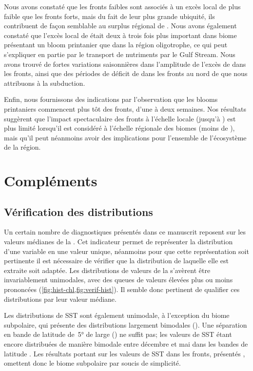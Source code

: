 Nous avons constaté que les fronts faibles sont associés à un excès local de  plus faible que les fronts forts, mais du fait de leur plus grande ubiquité, ils contribuent de façon semblable au surplus régional de .
Nous avons également constaté que l'excès local de  était deux à trois fois plus important dans biome présentant un bloom printanier que dans la région oligotrophe, ce qui peut s'expliquer en partie par le transport de nutriments par le Gulf Stream.
Nous avons trouvé de fortes variations saisonnières dans l'amplitude de l'excès de  dans les fronts, ainsi que des périodes de déficit de  dans les fronts au nord de  que nous attribuons à la subduction.

Enfin, nous fournissons des indications par l'observation que les blooms printaniers commencent plus tôt des fronts, d'une à deux semaines.
Nos résultats suggèrent que l'impact spectaculaire des fronts à l'échelle locale (jusqu'à ) est plus limité lorsqu'il est considéré à l'échelle régionale des biomes (moins de ), mais qu'il peut néanmoins avoir des implications pour l'ensemble de l'écosystème de la région.

\insertArticle{}

\section{Compléments}
\label{sec:complements-chl}
\suppressfloats[t]

\subsection{Vérification des distributions}
\label{sec:verif-hist}

Un certain nombre de diagnostiques présentés dans ce manuscrit reposent sur les valeurs médianes de la .
Cet indicateur permet de représenter la distribution d'une variable en une valeur unique, néanmoins pour que cette représentation soit pertinente il est nécessaire de vérifier que la distribution de laquelle elle est extraite soit adaptée.
Les distributions de valeurs de la  s'avèrent être invariablement unimodales, avec des queues de valeurs élevées plus ou moins prononcées (\cref{fig:hist-chl,fig:verif-hist}).
Il semble donc pertinent de qualifier ces distributions par leur valeur médiane.

Les distributions de SST sont également unimodale, à l'exception du biome subpolaire, qui présente des distributions largement bimodales ().
Une séparation en bande de latitude de~\ang{5} de large () ne suffit pas; les valeurs de SST étant encore distribuées de manière bimodale entre décembre et mai dans les bandes de latitude .
Les résultats portant sur les valeurs de SST dans les fronts, présentés , omettent donc le biome subpolaire par soucis de simplicité.


